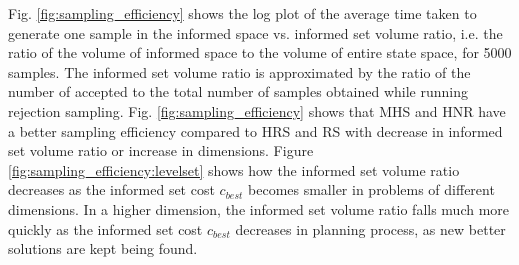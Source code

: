 \documentclass[letterpaper, 10 pt, conference]{ieeeconf}  %
\begin{document}
Fig. \ref{fig:sampling_efficiency} shows the log plot of the average time taken to generate one sample in the informed space vs. informed set volume ratio, i.e. the ratio of the volume of informed space to the volume of entire state space, for 5000 samples. 
The informed set volume ratio is approximated by the ratio of the number of accepted to the total number of samples obtained while running rejection sampling. 
Fig. \ref{fig:sampling_efficiency} shows that MHS and HNR have a better sampling efficiency compared to HRS and RS with decrease in informed set volume ratio or increase in dimensions. 
Figure \ref{fig:sampling_efficiency:levelset} shows how the informed set volume ratio decreases as the informed set cost $ c_{best} $ becomes smaller in problems of different dimensions.
In a higher dimension, the informed set volume ratio falls much more quickly as the informed set cost $ c_{best} $ decreases in planning process, as new better solutions are kept being found.
\end{document}
